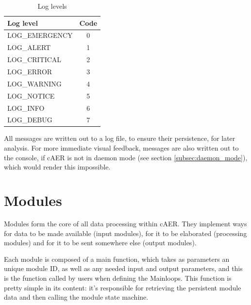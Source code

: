 \documentclass[a4paper,12pt]{report}
\begin{document}
\begin{table}[H]
\begin{center}
\caption{Log levels}
\label{tab:log_levels}
\begin{tabu} to \linewidth {|l|c|}
\hline
Log level & Code \\ \hline
LOG\_EMERGENCY & 0 \\ \hline
LOG\_ALERT & 1 \\ \hline
LOG\_CRITICAL & 2 \\ \hline
LOG\_ERROR & 3 \\ \hline
LOG\_WARNING & 4 \\ \hline
LOG\_NOTICE & 5 \\ \hline
LOG\_INFO & 6 \\ \hline
LOG\_DEBUG  & 7 \\ \hline
\end{tabu}
\end{center}
\end{table}

All messages are written out to a log file, to ensure their persistence, for later analysis.
For more immediate visual feedback, messages are also written out to the console, if cAER is not in daemon mode (see section \ref{subsec:daemon_mode}), which would render this impossible.

\section{Modules} \label{sec:modules}

Modules form the core of all data processing within cAER.
They implement ways for data to be made available (input modules), for it to be elaborated (processing modules) and for it to be sent somewhere else (output modules).

Each module is composed of a main function, which takes as parameters an unique module ID, as well as any needed input and output parameters, and this is the function called by users when defining the Mainloops.
This function is pretty simple in its content: it's responsible for retrieving the persistent module data and then calling the module state machine.
\end{document}
